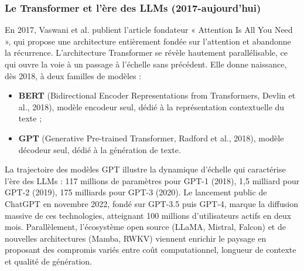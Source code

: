 \documentclass[12pt,twoside]{report}
\begin{document}
\subsubsection{Le Transformer et l'ère des LLMs (2017-aujourd'hui)}
En 2017, Vaswani et al. publient l'article fondateur « Attention Is All You Need », qui propose une architecture entièrement fondée sur l'attention et abandonne la récurrence. L'architecture Transformer se révèle hautement parallélisable, ce qui ouvre la voie à un passage à l'échelle sans précédent. Elle donne naissance, dès 2018, à deux familles de modèles :
\begin{itemize}
    \item \textbf{BERT} (Bidirectional Encoder Representations from Transformers, Devlin et al., 2018), modèle encodeur seul, dédié à la représentation contextuelle du texte ;
    \item \textbf{GPT} (Generative Pre-trained Transformer, Radford et al., 2018), modèle décodeur seul, dédié à la génération de texte.
\end{itemize}
La trajectoire des modèles GPT illustre la dynamique d'échelle qui caractérise l'ère des LLMs : 117 millions de paramètres pour GPT-1 (2018), 1,5 milliard pour GPT-2 (2019), 175 milliards pour GPT-3 (2020). Le lancement public de ChatGPT en novembre 2022, fondé sur GPT-3.5 puis GPT-4, marque la diffusion massive de ces technologies, atteignant 100 millions d'utilisateurs actifs en deux mois. Parallèlement, l'écosystème open source (LLaMA, Mistral, Falcon) et de nouvelles architectures (Mamba, RWKV) viennent enrichir le paysage en proposant des compromis variés entre coût computationnel, longueur de contexte et qualité de génération.

\end{document}
